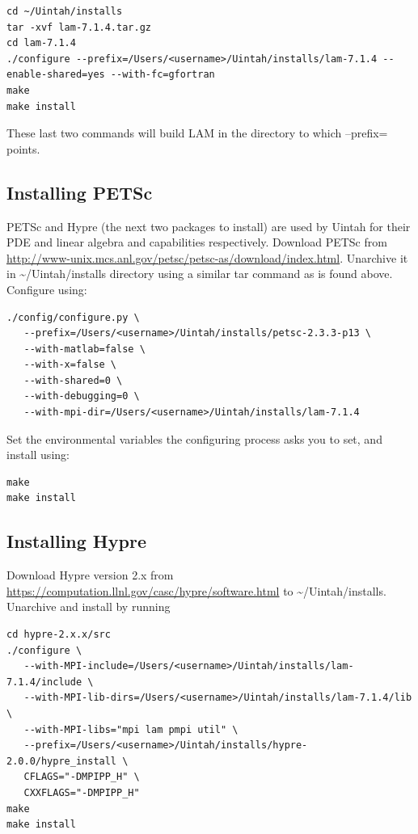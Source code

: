 \documentclass[12pt]{article}
\begin{document}
\begin{verbatim}
cd ~/Uintah/installs
tar -xvf lam-7.1.4.tar.gz
cd lam-7.1.4
./configure --prefix=/Users/<username>/Uintah/installs/lam-7.1.4 --enable-shared=yes --with-fc=gfortran
make
make install
\end{verbatim}

These last two commands will build LAM in the directory to which --prefix= points.

\subsection{Installing PETSc}
PETSc and Hypre (the next two packages to install) are used by Uintah for their PDE and linear algebra and capabilities respectively.
Download PETSc from \url{http://www-unix.mcs.anl.gov/petsc/petsc-as/download/index.html}.  Unarchive it in \textasciitilde/Uintah/installs directory using a similar tar command as is found above.  Configure using:

\begin{verbatim}
./config/configure.py \
   --prefix=/Users/<username>/Uintah/installs/petsc-2.3.3-p13 \
   --with-matlab=false \
   --with-x=false \
   --with-shared=0 \
   --with-debugging=0 \
   --with-mpi-dir=/Users/<username>/Uintah/installs/lam-7.1.4
\end{verbatim}

Set the environmental variables the configuring process asks you to set, and install using:

\begin{verbatim}
make
make install
\end{verbatim}

\subsection{Installing Hypre}
Download Hypre version 2.x from \url{https://computation.llnl.gov/casc/hypre/software.html} to \textasciitilde/Uintah/installs.  Unarchive and install by running

\begin{verbatim}
cd hypre-2.x.x/src
./configure \
   --with-MPI-include=/Users/<username>/Uintah/installs/lam-7.1.4/include \
   --with-MPI-lib-dirs=/Users/<username>/Uintah/installs/lam-7.1.4/lib \
   --with-MPI-libs="mpi lam pmpi util" \
   --prefix=/Users/<username>/Uintah/installs/hypre-2.0.0/hypre_install \
   CFLAGS="-DMPIPP_H" \
   CXXFLAGS="-DMPIPP_H" 
make
make install
\end{verbatim}
\end{document}

